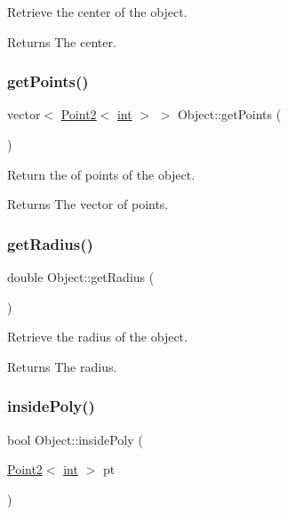 Retrieve the center of the object. 

\begin{DoxyReturn}{Returns}
The center. 
\end{DoxyReturn}
\mbox{\label{class_object_a21f5814fc1e2b6765bdefca5091f2e26}} 
\subsubsection{\texorpdfstring{getPoints()}{getPoints()}}
{\footnotesize\ttfamily vector$<$ \mbox{\hyperlink{class_point2}{Point2}}$<$ \mbox{\hyperlink{draw_8hh_aa620a13339ac3a1177c86edc549fda9b}{int}} $>$ $>$ Object\+::get\+Points (\begin{DoxyParamCaption}{ }\end{DoxyParamCaption})}



Return the of points of the object. 

\begin{DoxyReturn}{Returns}
The vector of points. 
\end{DoxyReturn}
\mbox{\label{class_object_ac7932a458c6259d0b61bc294b3c5369c}} 
\subsubsection{\texorpdfstring{getRadius()}{getRadius()}}
{\footnotesize\ttfamily double Object\+::get\+Radius (\begin{DoxyParamCaption}{ }\end{DoxyParamCaption})}



Retrieve the radius of the object. 

\begin{DoxyReturn}{Returns}
The radius. 
\end{DoxyReturn}
\mbox{\label{class_object_a8f54d70eb539d4ea2d05993cfd51fcc9}} 
\subsubsection{\texorpdfstring{insidePoly()}{insidePoly()}}
{\footnotesize\ttfamily bool Object\+::inside\+Poly (\begin{DoxyParamCaption}\item[{\mbox{\hyperlink{class_point2}{Point2}}$<$ \mbox{\hyperlink{draw_8hh_aa620a13339ac3a1177c86edc549fda9b}{int}} $>$}]{pt }\end{DoxyParamCaption})}



